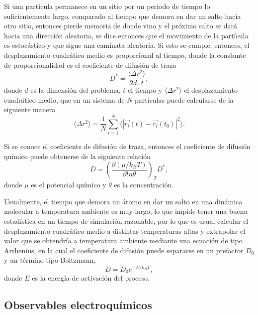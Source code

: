 Si una partícula permanece en un sitio por un periodo de tiempo lo 
suficientemente largo, comparado al tiempo que demora en dar un salto hacia otro
sitio, entonces pierde memoria de donde vino y el próximo salto se dará hacia 
una dirección aleatoria, se dice entonces que el movimiento de la partícula es 
estocástico y que sigue una caminata aleatoria. Si esto se cumple, entonces, el 
desplazamiento cuadrático medio es proporcional al tiempo, donde la constante de 
proporcionalidad es el coeficiente de difusión de traza
\begin{equation}
    D^{*} = \frac{\langle \Delta r^2 \rangle}{2d\cdot t},
\end{equation}
donde $d$ es la dimensión del problema, $t$ el tiempo y 
$\langle \Delta r^2 \rangle$ el desplazamiento cuadrático medio, que en un 
sistema de $N$ partículas puede calcularse de la siguiente manera
\begin{equation}
    \langle \Delta r^2 \rangle = \frac{1}{N} \sum_{i=1}^{N} \langle |\vec{r_i}(t) - \vec{r_i}(t_0)|^2 \rangle.
\end{equation}

Si se conoce el coeficiente de difusión de traza, entonces el coeficiente de 
difusión químico puede obtenerse de la siguiente relación ~\cite{gomer1990}
\begin{equation}
    D = \left( \frac{\partial (\mu / k_BT)}{\partial ln \theta} \right)_T D^{*},
\end{equation}
donde $\mu$ es el potencial químico y $\theta$ es la concentración.

Usualmente, el tiempo que demora un átomo en dar un salto en una dinámica 
molecular a temperatura ambiente es muy largo, lo que impide tener una buena 
estadística en un tiempo de simulación razonable, por lo que es usual calcular 
el desplazamiento cuadrático medio a distintas temperaturas altas y extrapolar
el valor que se obtendría a temperatura ambiente mediante una ecuación de tipo 
Arrhenius, en la cual el coeficiente de difusión puede separarse en un 
prefactor $D_0$ y un término tipo Boltzmann,
\begin{equation}
    D = D_0 e^{-E / k_BT},
\end{equation}
donde $E$ es la energía de activación del proceso. 


\subsection{Observables electroquímicos}

